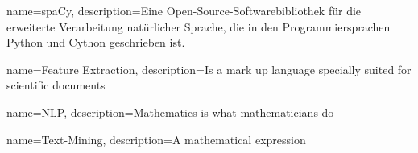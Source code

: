 %
%
{
        name=spaCy,
        description={Eine Open-Source-Softwarebibliothek für die erweiterte Verarbeitung natürlicher Sprache, die in den Programmiersprachen Python und Cython geschrieben ist.}
}

{
        name=Feature Extraction,
        description={Is a mark up language specially suited for 
scientific documents}
}

{
        name=NLP,
        description={Mathematics is what mathematicians do}
}

{
        name=Text-Mining,
        description={A mathematical expression}
}